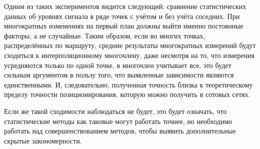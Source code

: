 Одним из таких экспериментов видится следующий: сравнение статистических данных об уровнях сигнала в ряде точек с учётом и без учёта соседних. При многократных изменениях на первый план должны выйти именно постоянные факторы, а не случайные. Таким образом, если во многих точках, распределённых по маршруту, средние результаты многократных измерений будут сходиться к интерполяционному многочлену, даже несмотря на то, что измерения усредняются только по одной точке, в многочлен учитывает все, это будет сильным аргументом в пользу того, что выявленные зависимости являются единственными. И, следовательно, полученная точность близка к теоретическому пределу точности позиционирования, которую можно получить в сотовых сетях.

Если же такой сходимости наблюдаться не будет, это будет означать, что статистические методы как таковые могут работать точнее, но необходимо работать над совершенствованием методов, чтобы выявить дополнительные скрытые закономерности.
